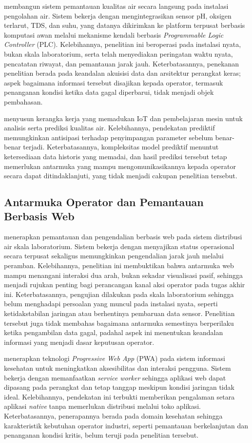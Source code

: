\textcite{forhad2024wtp} membangun sistem pemantauan kualitas air secara langsung pada instalasi pengolahan air.
Sistem bekerja dengan mengintegrasikan sensor pH, oksigen terlarut, TDS, dan suhu, yang datanya dikirimkan ke
platform terpusat berbasis komputasi awan melalui mekanisme kendali berbasis \textit{Programmable Logic
Controller} (PLC). Kelebihannya, penelitian ini beroperasi pada instalasi nyata, bukan skala laboratorium, serta
telah menyediakan peringatan waktu nyata, pencatatan riwayat, dan pemantauan jarak jauh. Keterbatasannya,
penekanan penelitian berada pada keandalan akuisisi data dan arsitektur perangkat keras; aspek bagaimana informasi
tersebut disajikan kepada operator, termasuk penanganan kondisi ketika data gagal diperbarui, tidak menjadi objek
pembahasan.

\textcite{rahu2023iot} menyusun kerangka kerja yang memadukan IoT dan pembelajaran mesin untuk analisis serta
prediksi kualitas air. Kelebihannya, pendekatan prediktif memungkinkan antisipasi terhadap penyimpangan parameter
sebelum benar-benar terjadi. Keterbatasannya, kompleksitas model prediktif menuntut ketersediaan data historis
yang memadai, dan hasil prediksi tersebut tetap memerlukan antarmuka yang mampu mengomunikasikannya kepada
operator secara dapat ditindaklanjuti, yang tidak menjadi cakupan penelitian tersebut.

\subsection{Antarmuka Operator dan Pemantauan Berbasis Web}
\textcite{low2022scada} menerapkan pemantauan dan pengendalian berbasis web pada sistem distribusi air skala
laboratorium. Sistem bekerja dengan menyajikan status operasional secara terpusat sekaligus memungkinkan
pengendalian jarak jauh melalui peramban. Kelebihannya, penelitian ini membuktikan bahwa antarmuka web mampu
menangani interaksi dua arah, bukan sekadar visualisasi pasif, sehingga menjadi rujukan penting bagi perancangan
kanal aksi operator pada tugas akhir ini. Keterbatasannya, pengujian dilakukan pada skala laboratorium sehingga
belum menghadapi persoalan yang muncul pada instalasi nyata, seperti ketidakstabilan jaringan atau berhentinya
pembaruan data sensor. Penelitian tersebut juga tidak membahas bagaimana antarmuka semestinya berperilaku ketika
pengambilan data gagal, padahal aspek ini menentukan keandalan informasi yang menjadi dasar keputusan operator.

\textcite{azhar2022pwa} menerapkan teknologi \textit{Progressive Web App} (PWA) pada sistem informasi kesehatan
untuk meningkatkan aksesibilitas dan interaksi pengguna. Sistem bekerja dengan memanfaatkan \textit{service
worker} sehingga aplikasi web dapat dipasang pada perangkat dan tetap tanggap meskipun kondisi jaringan tidak
ideal. Kelebihannya, pendekatan ini terbukti memberikan pengalaman setara aplikasi \textit{native} tanpa
memerlukan distribusi melalui toko aplikasi. Keterbatasannya, penerapannya berada pada domain kesehatan sehingga
karakteristik kebutuhan operator industri, seperti pemantauan berkelanjutan dan penanganan kondisi kritis, belum
teruji pada penelitian tersebut.

